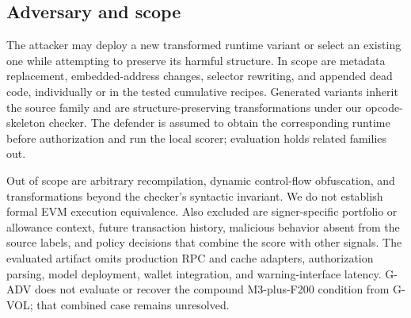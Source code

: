 \subsection{Adversary and scope}

The attacker may deploy a new transformed runtime variant or select an existing one while attempting to preserve its harmful structure. In scope are metadata replacement, embedded-address changes, selector rewriting, and appended dead code, individually or in the tested cumulative recipes. Generated variants inherit the source family and are structure-preserving transformations under our opcode-skeleton checker. The defender is assumed to obtain the corresponding runtime before authorization and run the local scorer; evaluation holds related families out.

Out of scope are arbitrary recompilation, dynamic control-flow obfuscation, and transformations beyond the checker's syntactic invariant. We do not establish formal EVM execution equivalence. Also excluded are signer-specific portfolio or allowance context, future transaction history, malicious behavior absent from the source labels, and policy decisions that combine the score with other signals. The evaluated artifact omits production RPC and cache adapters, authorization parsing, model deployment, wallet integration, and warning-interface latency. G-ADV does not evaluate or recover the compound M3-plus-F200 condition from G-VOL; that combined case remains unresolved.

